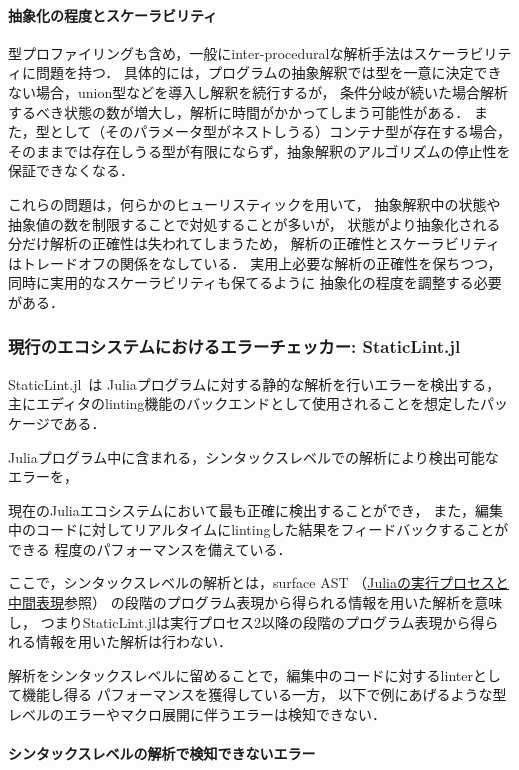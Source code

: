 \paragraph{抽象化の程度とスケーラビリティ}

型プロファイリングも含め，一般にinter-proceduralな解析手法はスケーラビリティに問題を持つ．
具体的には，プログラムの抽象解釈では型を一意に決定できない場合，union型などを導入し解釈を続行するが，
条件分岐が続いた場合解析するべき状態の数が増大し，解析に時間がかかってしまう可能性がある．
また，型として（そのパラメータ型がネストしうる）コンテナ型が存在する場合，
そのままでは存在しうる型が有限にならず，抽象解釈のアルゴリズムの停止性を保証できなくなる．

これらの問題は，何らかのヒューリスティックを用いて，
抽象解釈中の状態や抽象値の数を制限することで対処することが多いが，
状態がより抽象化される分だけ解析の正確性は失われてしまうため，
解析の正確性とスケーラビリティはトレードオフの関係をなしている．
実用上必要な解析の正確性を保ちつつ，同時に実用的なスケーラビリティも保てるように
抽象化の程度を調整する必要がある．

\subsubsection{現行のエコシステムにおけるエラーチェッカー: StaticLint.jl} \label{subsubsection:staticlint}

StaticLint.jl~\cite{staticlint}は
Juliaプログラムに対する静的な解析を行いエラーを検出する，
主にエディタのlinting機能のバックエンドとして使用されることを想定したパッケージである．

Juliaプログラム中に含まれる，シンタックスレベルでの解析により検出可能なエラーを，
\date{\today}現在のJuliaエコシステムにおいて最も正確に検出することができ，
また，編集中のコードに対してリアルタイムにlintingした結果をフィードバックすることができる
程度のパフォーマンスを備えている．

ここで，シンタックスレベルの解析とは，surface AST
（\hyperref[subsubsection:eval-process]{Juliaの実行プロセスと中間表現}参照）
の段階のプログラム表現から得られる情報を用いた解析を意味し，
つまりStaticLint.jlは実行プロセス2以降の段階のプログラム表現から得られる情報を用いた解析は行わない．

解析をシンタックスレベルに留めることで，編集中のコードに対するlinterとして機能し得る
パフォーマンスを獲得している一方，
以下で例にあげるような型レベルのエラーやマクロ展開に伴うエラーは検知できない．

\paragraph{シンタックスレベルの解析で検知できないエラー} \label{paragraph:syntax-analysis-limitation}

